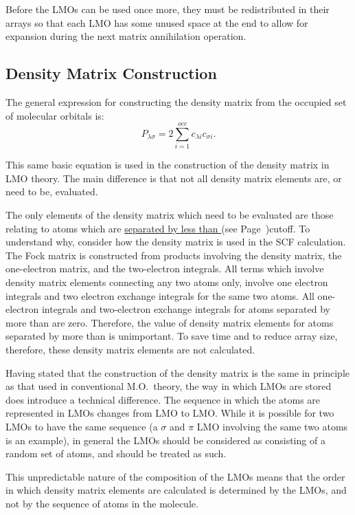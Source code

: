 Before the LMOs can be used once more, they must be redistributed in their
arrays so that each LMO has some unused space at the end to allow for expansion
during the next matrix annihilation operation.



\subsection{Density Matrix Construction}
The general expression for constructing the density matrix from the occupied
set of molecular orbitals is:
\begin{equation}
P_{\lambda \sigma} = 2\sum_{i=1}^{occ}c_{\lambda i}c_{\sigma i}.
\end{equation}

This same basic equation is used in the construction of the density matrix in
LMO theory.  The main difference is that not all density matrix elements are,
or need to be, evaluated.  

The only elements of the density matrix which need to be evaluated are
those relating to atoms which are \hyperref[pageref]{separated by less than
}{ (see Page~}{)}{cutoff}.  To understand why, consider how
the density matrix is used in the SCF calculation. The Fock matrix is
constructed from products involving the density matrix, the
one-electron matrix, and the two-electron integrals. All terms which
involve  density matrix elements connecting any two atoms only, involve
one electron integrals and two electron exchange integrals for  the
same two atoms. All one-electron integrals and two-electron exchange
integrals for atoms separated by more than  are zero.
Therefore, the value of density matrix elements for atoms separated by
more than  is unimportant.  To save time and to reduce
array size, therefore, these density matrix elements are not
calculated.

Having stated that the construction of the density matrix is the same in
principle as that used in conventional M.O.\ theory, the way in which LMOs are
stored does introduce a technical difference.  The sequence in which the atoms
are represented in LMOs changes from LMO to LMO.  While it is possible for two
LMOs to have the same sequence   (a $\sigma$ and $\pi$ LMO involving the same
two atoms is an example),  in general the LMOs should be considered as
consisting of a random set of atoms, and should be treated as such.

This unpredictable nature of the composition of the LMOs means that the order
in which density matrix elements are calculated is determined by the  LMOs, and
not by the sequence of atoms in the molecule.  

